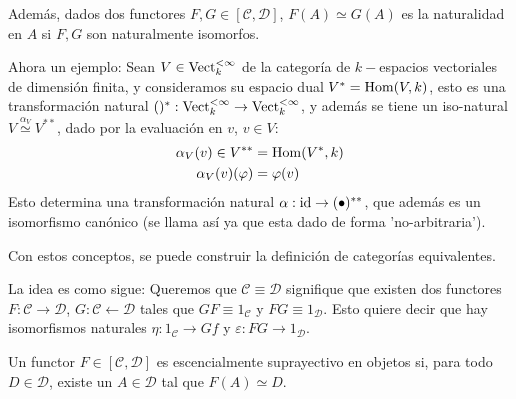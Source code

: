 Además, dados dos functores $F,G\in[\mathcal{C,D}]$, $F(A)\simeq G(A)$ es la naturalidad en $A$ si $F,G$ son naturalmente isomorfos.

Ahora un ejemplo:
Sean $V\in\mathrm{Vect}_k^{<\infty}$ de la categoría de $k-$espacios vectoriales de dimensión finita, y consideramos su espacio dual $V^*=\mathrm{Hom}(V,k)$, esto es una transformación natural $()^*:\mathrm{Vect}_k^{<\infty}\to\mathrm{Vect}_k^{<\infty}$, y además se tiene un iso-natural $V\overset{\alpha_V}{\simeq} V^{**}$, dado por la evaluación en $v$, $v\in V$:
    \begin{align*}
        \alpha_V(v)\in V^{**} & = \mathrm{Hom}(V^*,k) \\
        \alpha_V(v)(\varphi) & = \varphi(v)
    \end{align*}
Esto determina una transformación natural $\alpha:\mathrm{id}\to(\bullet)^{**}$, que además es un isomorfismo canónico (se llama así ya que esta dado de forma 'no-arbitraria').

Con estos conceptos, se puede construir la definición de categorías equivalentes.

La idea es como sigue: Queremos que $\mathcal{C\equiv D}$ signifique que existen dos functores $F:\mathcal{C\to D}$, $G:\mathcal{C\leftarrow D}$ tales que $GF\equiv 1_\mathcal{C}$ y $FG\equiv 1_\mathcal{D}$. Esto quiere decir que hay isomorfismos naturales $\eta:1_\mathcal{C}\to Gf$ y $\varepsilon: FG\to1_\mathcal{D}$.

\begin{definition}
    Un functor $F\in [\mathcal{C,D}]$ es escencialmente suprayectivo en objetos si, para todo $D\in\mathcal{D}$, existe un $A\in\mathcal{D}$ tal que $F(A)\simeq D$.
\end{definition}

